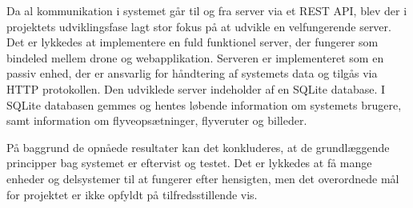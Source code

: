 Da al kommunikation i systemet går til og fra server via et REST API, blev der i projektets udviklingsfase lagt stor fokus på at udvikle en velfungerende server. Det er lykkedes at implementere en fuld funktionel server, der fungerer som bindeled mellem drone og webapplikation. Serveren er implementeret som en passiv enhed, der er ansvarlig for håndtering af systemets data og tilgås via HTTP protokollen. Den udviklede server indeholder af en SQLite database. I SQLite databasen gemmes og hentes løbende information om systemets brugere, samt information om flyveopsætninger, flyveruter og billeder. 


På baggrund de opnåede resultater kan det konkluderes, at de grundlæggende principper bag systemet er eftervist og testet. Det er lykkedes at få  mange enheder og delsystemer til at fungerer efter hensigten, men det overordnede mål for projektet er ikke opfyldt på tilfredsstillende vis.
